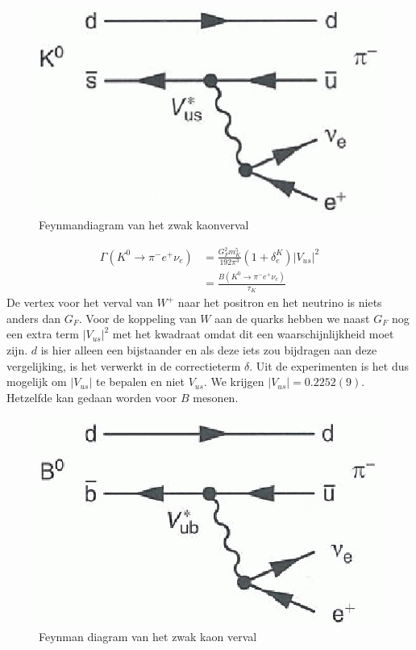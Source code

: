 \documentclass[../main.tex]{subfiles}
\begin{document}
\begin{figure}[h]
    \centering
    \includegraphics[width=0.5\linewidth]{meson_mixing_and_oscillations/zwak_s_verval.png}
    \caption{Feynmandiagram van het zwak kaonverval}%
    \label{fig:meson_mixing_and_oscillations/zwak_s_verval}
\end{figure}

\begin{equation}
    \begin{aligned}
        \label{eq:kaon_zwak_verval}
        \Gamma\left(K^{0} \rightarrow \pi^{-} e^{+} \nu_{e}\right) &=\frac{G_{F}^{2} m_{K}^{5}}{192 \pi^{3}}\left(1+\delta_{e}^{K}\right)\left|V_{u s}\right|^{2} \\
                                                                   &=\frac{B\left(K^{0} \rightarrow \pi^{-} e^{+} \nu_{e}\right)}{\tau_{K}}
    \end{aligned}
\end{equation}
De vertex voor het verval van $W^+$ naar het positron en het neutrino is niets anders dan $G_F$. Voor de koppeling van $W$ aan de quarks hebben we naast $G_F$ nog een extra term $|V_{us}|^2$ met het kwadraat omdat dit een waarschijnlijkheid moet zijn. $d$ is hier alleen een bijstaander en als deze iets zou bijdragen aan deze vergelijking, is het verwerkt in de correctieterm $\delta$. Uit de experimenten is het dus mogelijk om $|V_{us}|$ te bepalen en niet $V_{us}$. We krijgen $\left|V_{us}\right|=0.2252(9)$.\\
Hetzelfde kan gedaan worden voor $B$ mesonen.

\begin{figure}[h]
    \centering
    \includegraphics[width=0.5\linewidth]{meson_mixing_and_oscillations/zwak_b_verval.png}
    \caption{Feynman diagram van het zwak kaon verval}%
    \label{fig:meson_mixing_and_oscillations/zwak_b_verval}
\end{figure}
\end{document}
